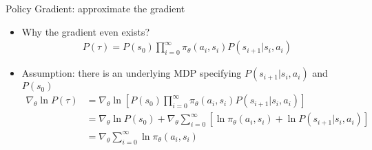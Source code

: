 \begin{frame}{Policy Gradient: approximate the gradient}
    \begin{itemize}
        \item Why the gradient even exists?
            \begin{equation}
                \label{PG2}
                \begin{split}
                    P(\tau) = P(s_0) \prod\limits_{i=0}^\infty \pi_\theta(a_i,s_i) P(s_{i+1} | s_i,a_i)
                \end{split}
            \end{equation}
        \item Assumption: there is an underlying MDP specifying $P(s_{i+1} | s_i,a_i)$ and $P(s_0)$
            \begin{equation}
                \label{PG3}
                \begin{split}
                    \nabla_{\theta}\ln P(\tau) &= \nabla_{\theta}\ln [P(s_0) \prod\limits_{i=0}^\infty \pi_\theta(a_i,s_i) P(s_{i+1} | s_i,a_i)]\\
                                               &= \nabla_{\theta}\ln P(s_0) + \nabla_{\theta}\sum\limits_{i=0}^\infty [\ln \pi_\theta(a_i,s_i)+\ln P(s_{i+1} | s_i,a_i)]\\
                                               &= \nabla_{\theta}\sum\limits_{i=0}^\infty \ln \pi_\theta(a_i,s_i)
                \end{split}
            \end{equation}
    \end{itemize}
\end{frame}


